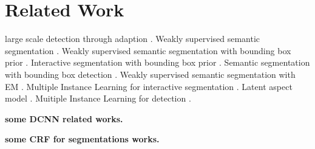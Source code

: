 \section{Related Work}
large scale detection through adaption \citep{Hoffman14Lsda}. 
Weakly supervised semantic segmentation \citep{xu2014tell, LiICML2014, vezhnevets2010towards, vezhnevets2011weakly, vezhnevets2012weakly}.
Weakly supervised semantic segmentation with bounding box prior \citep{kuettel2012segmentation}. Interactive segmentation with bounding box prior \citep{lempitsky2009image}.
Semantic segmentation with bounding box detection \citep{xia2013semantic}.
Weakly supervised semantic segmentation with EM \citep{duygulu2002object}.
Multiple Instance Learning for interactive segmentation \citep{WuMilcut}. 
Latent aspect model \citep{verbeek2007region}.
Muitiple Instance Learning for detection \citep{aliconfidence, papandreou2014untangling, song2014learning}.

{\bf{some DCNN related works.}}

{\bf{some CRF for segmentations works.}}
